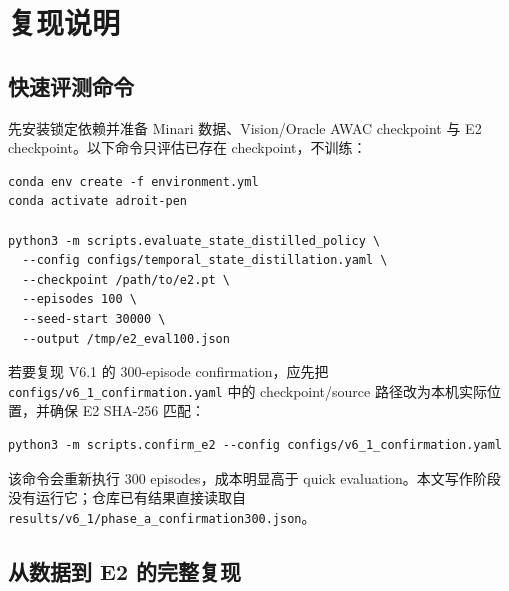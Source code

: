 \hypertarget{ux590dux73b0ux8bf4ux660e}{%
\section{复现说明}\label{ux590dux73b0ux8bf4ux660e}}

\hypertarget{ux5febux901fux8bc4ux6d4bux547dux4ee4}{%
\subsection{快速评测命令}\label{ux5febux901fux8bc4ux6d4bux547dux4ee4}}

先安装锁定依赖并准备 Minari 数据、Vision/Oracle AWAC checkpoint 与 E2 checkpoint。以下命令只评估已存在 checkpoint，不训练：

\begin{Verbatim}[breaklines=true,breakanywhere=true,fontsize=\small]
conda env create -f environment.yml
conda activate adroit-pen

python3 -m scripts.evaluate_state_distilled_policy \
  --config configs/temporal_state_distillation.yaml \
  --checkpoint /path/to/e2.pt \
  --episodes 100 \
  --seed-start 30000 \
  --output /tmp/e2_eval100.json
\end{Verbatim}

若要复现 V6.1 的 300-episode confirmation，应先把 \texttt{configs/v6\_1\_confirmation.yaml} 中的 checkpoint/source 路径改为本机实际位置，并确保 E2 SHA-256 匹配：

\begin{Verbatim}[breaklines=true,breakanywhere=true,fontsize=\small]
python3 -m scripts.confirm_e2 --config configs/v6_1_confirmation.yaml
\end{Verbatim}

该命令会重新执行 300 episodes，成本明显高于 quick evaluation。本文写作阶段没有运行它；仓库已有结果直接读取自 \nolinkurl{results/v6_1/phase_a_confirmation300.json}。

\hypertarget{ux4eceux6570ux636eux5230-e2-ux7684ux5b8cux6574ux590dux73b0}{%
\subsection{从数据到 E2 的完整复现}\label{ux4eceux6570ux636eux5230-e2-ux7684ux5b8cux6574ux590dux73b0}}

